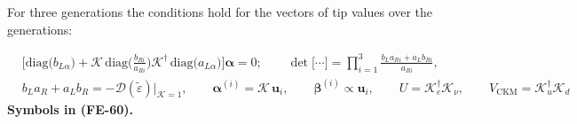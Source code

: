 \documentclass[
  10pt,
]{article}
\begin{document}
For three generations the conditions hold for the vectors of tip values
over the generations:

\[
\begin{aligned}
&\Big[\mathrm{diag}\big(b_{L\alpha}\big) +
 \mathcal{K}\,\mathrm{diag}\Big(\frac{b_{Ri}}{a_{Ri}}\Big)\mathcal{K}^\dagger\,
 \mathrm{diag}\big(a_{L\alpha}\big)\Big]\boldsymbol{\alpha} = 0;\qquad
 \det\big[\cdots\big] = \prod_{i=1}^{3}\frac{b_La_{Ri} + a_Lb_{Ri}}{a_{Ri}},\\
&b_La_R + a_Lb_R = -\mathcal{D}(\tilde\varepsilon)\big\vert_{\mathcal{K} = 1},\qquad
 \boldsymbol{\alpha}^{(i)} = \mathcal{K}\,\mathbf{u}_i,\qquad \boldsymbol{\beta}^{(i)} \propto
 \mathbf{u}_i,\qquad
 U = \mathcal{K}_e^\dagger\mathcal{K}_\nu,\qquad V_{\mathrm{CKM}} = \mathcal{K}_u^\dagger\mathcal{K}_d
\end{aligned} \tag{FE-60}
\] \textbf{Symbols in (FE-60).}
\end{document}
